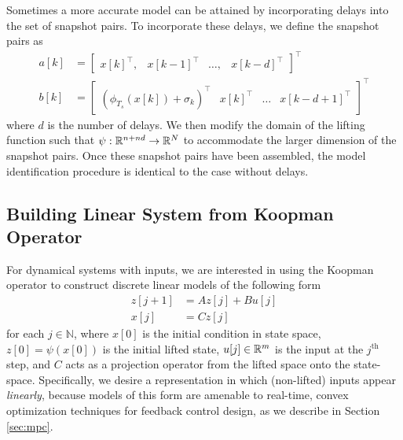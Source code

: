Sometimes a more accurate model can be attained by incorporating delays into the set of snapshot pairs. 
To incorporate these delays, we define the snapshot pairs as
\begin{align}
    a[k] &= \begin{bmatrix} x[k]^\top, & x[k-1]^\top & \ldots, & x[k-d]^\top \end{bmatrix}^\top \label{eq:snapd1} \\
    b[k] &= \begin{bmatrix} \left( \phi_{T_s} (x[k]) + \sigma_k \right)^\top & x[k]^\top & \ldots & x[k-d+1]^\top \end{bmatrix}^\top \label{eq:snapd2}
\end{align}
where $d$ is the number of delays.
We then modify the domain of the lifting function such that $\psi : \mathbb{R}^{n+nd} \to \mathbb{R}^{N}$ to accommodate the larger dimension of the snapshot pairs.
Once these snapshot pairs have been assembled, the model identification procedure is identical to the case without delays.

\subsection{Building Linear System from Koopman Operator}

For dynamical systems with inputs, we are interested in using the Koopman operator to construct discrete linear models of the following form
\begin{equation}
\begin{aligned}
    z[j+1] &= A z[j] + B u[j] \\
    x[j] &= C z[j]
    \label{eq:linSys}
\end{aligned}
\end{equation}
for each $j \in \mathbb{N}$, where $x[0]$ is the initial condition in state space, $z[0] = \psi(x[0])$ is the initial lifted state, $u[j] \in \mathbb{R}^m$ is the input at the $j^{\text{th}}$ step, and $C$ acts as a projection operator from the lifted space onto the state-space.
Specifically, we desire a representation in which (non-lifted) inputs appear \emph{linearly}, because models of this form are amenable to real-time, convex optimization techniques for feedback control design, as we describe in Section \ref{sec:mpc}.

